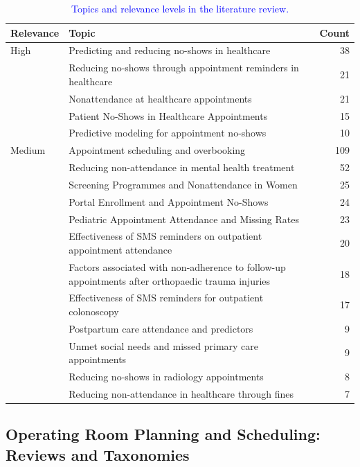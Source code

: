 \documentclass[sn-mathphys-num]{sn-jnl}
\begin{document}
    \begin{table}[ht]
    \centering
    \caption{\textcolor{blue}{Topics and relevance levels in the literature review.}}
    \label{tab:topics_relevance}
    \begin{tabularx}{\textwidth}{@{}lXr@{}}
    \hline
    \textbf{Relevance} & \textbf{Topic} & \textbf{Count} \\ \hline
    High & Predicting and reducing no-shows in healthcare & 38 \\
         & Reducing no-shows through appointment reminders in healthcare & 21 \\
         & Nonattendance at healthcare appointments & 21 \\
         & Patient No-Shows in Healthcare Appointments & 15 \\
         & Predictive modeling for appointment no-shows & 10 \\ \hline
    Medium & Appointment scheduling and overbooking & 109 \\
           & Reducing non-attendance in mental health treatment & 52 \\
           & Screening Programmes and Nonattendance in Women & 25 \\
           & Portal Enrollment and Appointment No-Shows & 24 \\
           & Pediatric Appointment Attendance and Missing Rates & 23 \\
           & Effectiveness of SMS reminders on outpatient appointment attendance & 20 \\
           & Factors associated with non-adherence to follow-up appointments after orthopaedic trauma injuries & 18 \\
           & Effectiveness of SMS reminders for outpatient colonoscopy & 17 \\
           & Postpartum care attendance and predictors & 9 \\
           & Unmet social needs and missed primary care appointments & 9 \\
           & Reducing no-shows in radiology appointments & 8 \\
           & Reducing non-attendance in healthcare through fines & 7 \\ \hline
    \end{tabularx}
    \end{table}


    \subsection*{Operating Room Planning and Scheduling: Reviews and Taxonomies}
\end{document}
